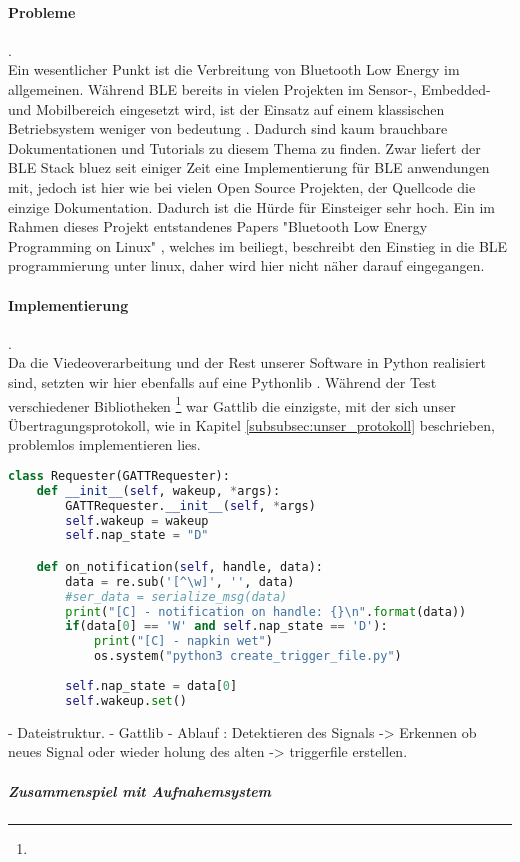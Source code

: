 \paragraph{Probleme}. \\ 
Ein wesentlicher Punkt ist die Verbreitung von Bluetooth Low Energy im allgemeinen. Während BLE bereits in vielen Projekten im Sensor-, Embedded- und Mobilbereich eingesetzt wird, ist der Einsatz auf einem klassischen Betriebsystem weniger von bedeutung . Dadurch sind kaum brauchbare Dokumentationen und Tutorials zu diesem Thema zu finden. Zwar liefert der BLE Stack bluez seit einiger Zeit eine Implementierung für BLE anwendungen mit, jedoch ist hier wie bei vielen Open Source Projekten, der Quellcode die einzige Dokumentation. Dadurch ist die Hürde für Einsteiger sehr hoch. Ein im Rahmen dieses Projekt entstandenes Papers "Bluetooth Low Energy Programming on Linux"  , welches im   beiliegt, beschreibt den Einstieg in die BLE programmierung unter linux, daher wird hier nicht näher darauf eingegangen. 

\paragraph{Implementierung}. \\

Da die Viedeoverarbeitung und der Rest unserer Software in Python realisiert sind, setzten wir hier ebenfalls auf eine Pythonlib . Während der Test verschiedener Bibliotheken \footnote{} war Gattlib die einzigste, mit der sich unser Übertragungsprotokoll, wie in Kapitel \ref{subsubsec:unser_protokoll} beschrieben, problemlos implementieren lies. 

\begin{lstlisting}[language=Python, caption=Requester Class zur Verarbeitung der einkommenden Daten ]
class Requester(GATTRequester):
    def __init__(self, wakeup, *args):
        GATTRequester.__init__(self, *args)
        self.wakeup = wakeup
        self.nap_state = "D"

    def on_notification(self, handle, data):
        data = re.sub('[^\w]', '', data)
        #ser_data = serialize_msg(data)
        print("[C] - notification on handle: {}\n".format(data))
        if(data[0] == 'W' and self.nap_state == 'D'):
            print("[C] - napkin wet")
            os.system("python3 create_trigger_file.py")
            
        self.nap_state = data[0]
        self.wakeup.set()
\end{lstlisting}
\label{lst:eval_com_gattlib}

- Dateistruktur.
- Gattlib
- Ablauf : Detektieren des Signals -> Erkennen ob neues Signal oder wieder holung des alten
  -> triggerfile erstellen.
  


\subparagraph{Zusammenspiel mit Aufnahemsystem}
